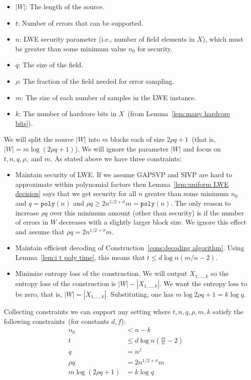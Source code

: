 \documentclass[11pt]{article}
\newcommand{\lemref}[1]{\mbox{Lemma~\ref{#1}}}
\newcommand{\poly}{\ensuremath{\mathtt{poly}}\xspace}
\begin{document}
\begin{itemize}
\item $|W|$: The length of the source.  
\item $t$: Number of errors that can be supported.  
\item $n$: LWE security parameter (i.e., number of field elements in $X$), which must be greater than some minimum value $n_0$ for security.
\item $q$: The size of the field.  
\item $\rho$: The fraction of the field needed for error sampling.  
\item $m$: The size of each number of samples in the LWE instance.  
\item $k$: The number of hardcore bits in $X$~(from \lemref{lem:many hardcore bits}).
\end{itemize}
We will split the source $|W|$ into $m$ blocks each of size $2\rho q+1$~(that is, $|W| = m\log (2\rho q+1)$).  We will ignore the parameter $|W|$ and focus on $t, n, q, \rho,$ and $m$.  As stated above we have three constraints:
\begin{itemize}
\item Maintain security of LWE.  If we assume GAPSVP and SIVP are hard to approximate within polynomial factors then \lemref{lem:uniform LWE decision} says that we get security for all $n$ greater than some minimum $n_0$ and $q = \poly(n)$ and $\rho q \geq 2 n^{1/2 + \sigma} m = \poly(n)$.  The only reason to increase $\rho q$ over this minimum amount (other than security) is if the number of errors in $W$ decreases with a slightly larger block size.  We ignore this effect and assume that $\rho q = 2n^{1/2+\sigma}m$.
\item Maintain efficient decoding of Construction~\ref{cons:decoding algorithm}.  Using \lemref{lem:i t poly time}, this means that $t\leq d\log n(m/n-2)$.
\item Minimize entropy loss of the construction.  We will output $X_{1,...,k}$ so the entropy loss of the construction is $|W|-|X_{1,..., k}|$.  We want the entropy loss to be zero, that is, $|W| = |X_{1,..., k}|$.  Substituting, one has $m\log 2\rho q+1 = k \log q$.
\end{itemize}
Collecting constraints we can support any setting where $t, n, q, \rho, m, k$ satisfy the following constraints~(for constants $d, f$):
\begin{align*}
n_0&< n -k \\
t&\leq d \log n\left(\frac{m}{n}-2\right)\\
q &= n^f\\
\rho q  &= 2n^{1/2+\sigma}m\\
m\log (2\rho q +1)&= k \log q
\end{align*}
\end{document}
